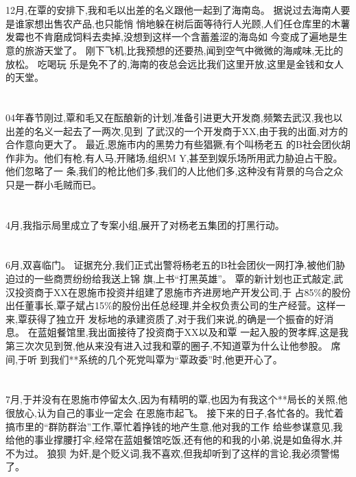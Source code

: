 \documentclass[11pt]{article}
\begin{document}
\section{}
12月,在覃的安排下,我和毛以出差的名义跟他一起到了海南岛。 据说过去海南人要是谁家想出售农产品,也只能悄
悄地躲在树后面等待行人光顾,人们任仓库里的木薯发霉也不肯磨成饲料去卖掉,没想到这样一个含蓄羞涩的海岛如
今变成了遍地是生意的旅游天堂了。 刚下飞机,比我预想的还要热,闻到空气中微微的海咸味,无比的放松。 吃喝玩
乐是免不了的,海南的夜总会远比我们这里开放,这里是金钱和女人的天堂。

\section{}
04年春节刚过,覃和毛又在酝酿新的计划,准备引进更大开发商,频繁去武汉,我也以出差的名义一起去了一两次,见到
了武汉的一个开发商于XX,由于我的出面,对方的合作意向更大了。 最近,恩施市内的黑势力有些猖獗,有个叫杨老五
的B社会团伙胡作非为。他们有枪,有人马,开赌场,组织M Y,甚至到娱乐场所用武力胁迫占干股。 他们忽略了一
条,我们的枪比他们多,我们的人比他们多,这种没有背景的乌合之众只是一群小毛贼而已。

\section{}
4月,我指示局里成立了专案小组,展开了对杨老五集团的打黑行动。

\section{}
6月,双喜临门。 证据充分,我们正式出警将杨老五的B社会团伙一网打净,被他们胁迫过的一些商贾纷纷给我送上锦
旗,上书``打黑英雄''。 覃的新计划也正式敲定,武汉投资商于XX在恩施市投资并组建了恩施市齐进房地产开发公司,于
占85\%的股份出任董事长,覃子斌占15\%的股份出任总经理,并全权负责公司的生产经营。这样一来,覃获得了独立开
发标地的承建资质了,对于我们来说,的确是一个振奋的好消息。 在蓝姐餐馆里,我出面接待了投资商于XX以及和覃
一起入股的贺孝辉,这是我第三次次见到贺,他从来没有进入过我和覃的圈子,不知道覃为什么让他参股。 席间,于听
到我们**系统的几个死党叫覃为``覃政委''时,他更开心了。

\section{}
7月,于并没有在恩施市停留太久,因为有精明的覃,也因为有我这个**局长的关照,他很放心,认为自己的事业一定会
在恩施市起飞。 接下来的日子,各忙各的。我忙着搞市里的``群防群治''工作,覃忙着挣钱的地产生意,他对我的工作
给些参谋意见,我给他的事业撑腰打伞,经常在蓝姐餐馆吃饭,还有他的和我的小弟,说是如鱼得水,并不为过。 狼狈
为奸,是个贬义词,我不喜欢,但我却听到了这样的言论,我必须警惕了。
\end{document}
